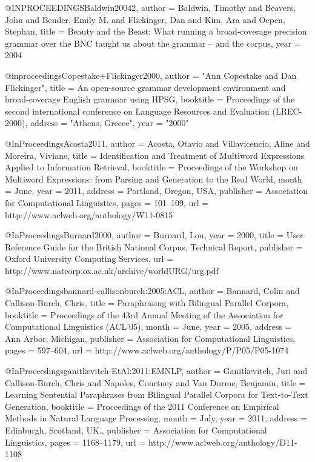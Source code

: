 @INPROCEEDINGS{Baldwin20042,
  author = {Baldwin, Timothy and Beavers, John and Bender, Emily M. and Flickinger, Dan and Kim, Ara and Oepen, Stephan},
  title = {Beauty and the Beast: What running a broad-coverage precision grammar over the {BNC} taught us about the grammar -- and the corpus},
  year = {2004}
}

@inproceedings{Copestake+Flickinger2000,
  author = "Ann Copestake and Dan Flickinger", 
  title = {{An open-source grammar development environment and broad-coverage English grammar using HPSG}},
  booktitle = {Proceedings of the second international conference on Language Resources and Evaluation (LREC-2000)}, 
  address = "Athens, Greece",
  year = "2000"
}

@InProceedings{Acosta2011,
  author    = {Acosta, Otavio  and  Villavicencio, Aline  and  Moreira, Viviane},
  title     = {Identification and Treatment of Multiword Expressions Applied to Information Retrieval},
  booktitle = {Proceedings of the Workshop on Multiword Expressions: from Parsing and Generation to the Real World},
  month     = {June},
  year      = {2011},
  address   = {Portland, Oregon, USA},
  publisher = {Association for Computational Linguistics},
  pages     = {101--109},
  url       = {http://www.aclweb.org/anthology/W11-0815}
}

@InProceedings{Burnard2000,
  author    = {Burnard, Lou},
  year = {2000},
  title     = {User Reference Guide for the British National Corpus, Technical Report},
  publisher = {Oxford University Computing Services},
  url       = {http://www.natcorp.ox.ac.uk/archive/worldURG/urg.pdf}
}

@InProceedings{bannard-callisonburch:2005:ACL,
  author    = {Bannard, Colin  and  Callison-Burch, Chris},
  title     = {Paraphrasing with Bilingual Parallel Corpora},
  booktitle = {Proceedings of the 43rd Annual Meeting of the Association for Computational Linguistics (ACL'05)},
  month     = {June},
  year      = {2005},
  address   = {Ann Arbor, Michigan},
  publisher = {Association for Computational Linguistics},
  pages     = {597--604},
  url       = {http://www.aclweb.org/anthology/P/P05/P05-1074}
}

@InProceedings{ganitkevitch-EtAl:2011:EMNLP,
  author    = {Ganitkevitch, Juri  and  Callison-Burch, Chris  and  Napoles, Courtney  and  Van Durme, Benjamin},
  title     = {Learning Sentential Paraphrases from Bilingual Parallel Corpora for Text-to-Text Generation},
  booktitle = {Proceedings of the 2011 Conference on Empirical Methods in Natural Language Processing},
  month     = {July},
  year      = {2011},
  address   = {Edinburgh, Scotland, UK.},
  publisher = {Association for Computational Linguistics},
  pages     = {1168--1179},
  url       = {http://www.aclweb.org/anthology/D11-1108}
}

